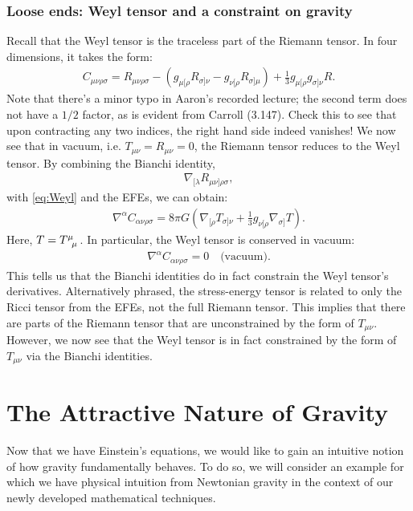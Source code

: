 \documentclass[10pt]{article}
\newcommand{\<}{\langle}
\renewcommand{\>}{\rangle}
\renewcommand{\(}{\left(}
\renewcommand{\)}{\right)}
\renewcommand{\[}{\left[}
\renewcommand{\]}{\right]}
\begin{document}
		\section{Loose ends: Weyl tensor and a constraint on gravity}
		Recall that the Weyl tensor is the traceless part of the Riemann tensor. In four dimensions, it takes the form:
		\begin{align}\label{eq:Weyl}
			C_{\mu\nu\rho\sigma} = R_{\mu\nu\rho\sigma} - \( g_{\mu[\rho} R_{\sigma]\nu} - g_{\nu[\rho} R_{\sigma]\mu} \) + \frac{1}{3} g_{\mu[\rho} g_{\sigma]\nu} R.
		\end{align}
		Note that there's a minor typo in Aaron's recorded lecture; the second term does not have a $1/2$ factor, as is evident from Carroll (3.147). Check this to see that upon contracting any two indices, the right hand side indeed vanishes! We now see that in vacuum, i.e. $T_{\mu\nu} = R_{\mu\nu} = 0$, the Riemann tensor reduces to the Weyl tensor. By combining the Bianchi identity,
		\begin{align}
			\nabla_{[\lambda} R_{\mu\nu]\rho\sigma},
		\end{align}
		with \eqref{eq:Weyl} and the EFEs, we can obtain:
		\begin{align}
			\nabla^\alpha C_{\alpha\nu\rho\sigma} = 8\pi G \( \nabla_{[\rho} T_{\sigma]\nu} + \frac{1}{3} g_{\nu[\rho} \nabla_{\sigma]} T \).
		\end{align}
		Here, $T = \tensor{T}{^\mu_\mu}$. In particular, the Weyl tensor is conserved in vacuum:
		\begin{align}
			\nabla^\alpha C_{\alpha\nu\rho\sigma} = 0 \quad\text{(vacuum)}.
		\end{align}
		This tells us that the Bianchi identities do in fact constrain the Weyl tensor's derivatives. Alternatively phrased, the stress-energy tensor is related to only the Ricci tensor from the EFEs, not the full Riemann tensor. This implies that there are parts of the Riemann tensor that are unconstrained by the form of $T_{\mu\nu}$. However, we now see that the Weyl tensor is in fact constrained by the form of $T_{\mu\nu}$ via the Bianchi identities.
		
	\newpage
	\part{The Attractive Nature of Gravity}
	Now that we have Einstein's equations, we would like to gain an intuitive notion of how gravity fundamentally behaves. To do so, we will consider an example for which we have physical intuition from Newtonian gravity in the context of our newly developed mathematical techniques.
\end{document}
